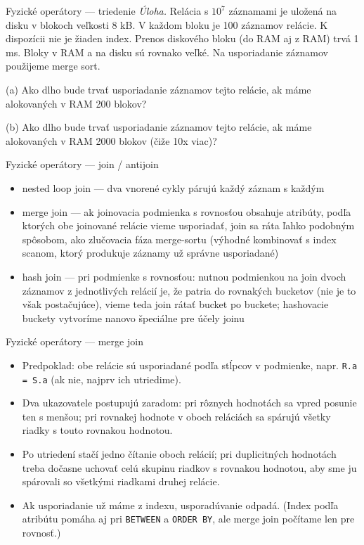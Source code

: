 \documentclass[12pt]{beamer}
\begin{document}
\begin{frame}[fragile]{Fyzické operátory --- triedenie}
\emph{Úloha.}
Relácia s $10^7$ záznamami je uložená na disku v blokoch veľkosti 8 kB.
V každom bloku je 100 záznamov relácie. K dispozícii nie je žiaden index.
Prenos diskového bloku (do RAM aj z RAM) trvá 1 ms.
Bloky v RAM a na disku sú rovnako veľké.
Na usporiadanie záznamov použijeme \alert{merge sort}.

(a) Ako dlho bude trvať usporiadanie záznamov tejto relácie,
ak máme alokovaných v RAM 200 blokov?

(b) Ako dlho bude trvať usporiadanie záznamov tejto relácie,
ak máme alokovaných v RAM 2000 blokov (čiže 10x viac)?
\end{frame}

\begin{frame}[fragile]{Fyzické operátory --- join / antijoin}
\begin{itemize}
\item \alert{nested loop join} --- dva vnorené cykly párujú každý záznam s každým
\item \alert{merge join} --- ak joinovacia podmienka s rovnosťou obsahuje atribúty,
    podľa ktorých obe joinované relácie vieme usporiadať, join sa ráta ľahko podobným spôsobom,
    ako zlučovacia fáza merge-sortu
    (výhodné kombinovať s index scanom, ktorý produkuje záznamy už správne usporiadané)
\item \alert{hash join} --- pri podmienke s rovnosťou: nutnou podmienkou na join
    dvoch záznamov z jednotlivých relácií je, že patria do rovnakých bucketov
    (nie je to však postačujúce), vieme teda join rátať bucket po buckete;
    hashovacie buckety vytvoríme nanovo špeciálne pre účely joinu
\end{itemize}
\end{frame}

\begin{frame}[fragile]{Fyzické operátory --- merge join}
\begin{itemize}
\item Predpoklad: obe relácie sú usporiadané podľa stĺpcov v podmienke, napr. \verb|R.a = S.a| (ak nie, najprv ich utriedime).
\item Dva ukazovatele postupujú zaradom: pri rôznych hodnotách sa vpred posunie ten s menšou; pri rovnakej hodnote v oboch reláciách sa spárujú všetky riadky s touto rovnakou hodnotou.
\item Po utriedení stačí jedno čítanie oboch relácií; pri duplicitných hodnotách treba dočasne uchovať celú skupinu riadkov s rovnakou hodnotou, aby sme ju spárovali so všetkými riadkami druhej relácie.
\item Ak usporiadanie už máme z indexu, usporadúvanie odpadá. (Index podľa atribútu pomáha aj pri \verb|BETWEEN| a \verb|ORDER BY|, ale merge join počítame len pre rovnosť.)
\end{itemize}
\end{frame}
\end{document}
